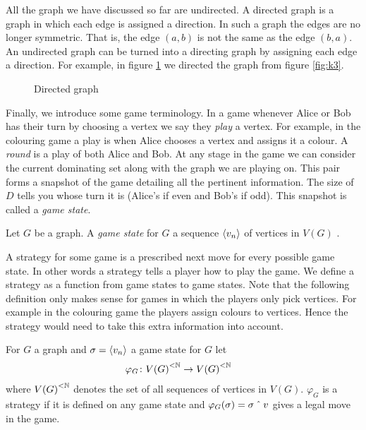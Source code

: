 All the graph we have discussed so far are undirected. A directed graph is a graph in which each edge is assigned a direction. In such a graph the edges are no longer symmetric. That is, the edge $(a,b)$ is not the same as the edge $(b,a)$. An undirected graph can be turned into a directing graph by assigning each edge a direction. For example, in figure \ref{fig:directed_graph} we directed the graph from figure \ref{fig:k3}. %
\begin{figure}[h]
    \centering
    \caption{Directed graph}
    \label{fig:directed_graph}
\end{figure}
   
Finally, we introduce some game terminology. In a game whenever Alice or Bob has their turn by choosing a vertex we say they \textit{play} a vertex. For example, in the colouring game a play is when Alice chooses a vertex and assigns it a colour. A \textit{round} is a play of both Alice and Bob.  At any stage in the game we can consider the current dominating set along with the graph we are playing on. This pair forms a snapshot of the game detailing all the pertinent information. The size of $D$ tells you whose turn it is (Alice's if even and Bob's if odd). This snapshot is called a \textit{game state}. 

\begin{definition}
    Let $G$ be a graph. A \textit{game state} for $G$ a sequence $\left\langle v_n \right\rangle$ of vertices in $V(G)$ .
\end{definition}

A strategy for some game is a prescribed next move for every possible game state. In other words a strategy tells a player how to play the game. We define a strategy as a function from game states to game states. Note that the following definition only makes sense for games in which the players only pick vertices. For example in the colouring game the players assign colours to vertices. Hence the strategy would need to take this extra information into account. 

\begin{definition}[Strategy]
    For $G$ a graph and $\sigma=\left\langle v_n \right\rangle$ a game state for $G$ let
    \begin{align*}        
    \varphi_G &\colon {V(G)}^{<\mathbb{N}} \to {V(G)}^{<\mathbb{N}} 
    \end{align*}
    where ${V(G)}^{<\mathbb{N}}$ denotes the set of all sequences of vertices in $V(G)$. $\varphi_G$ is a strategy if it is defined on any game state and $\varphi_G(\sigma)=\sigma\caret v$ gives a legal move in the game. 
\end{definition}
    
